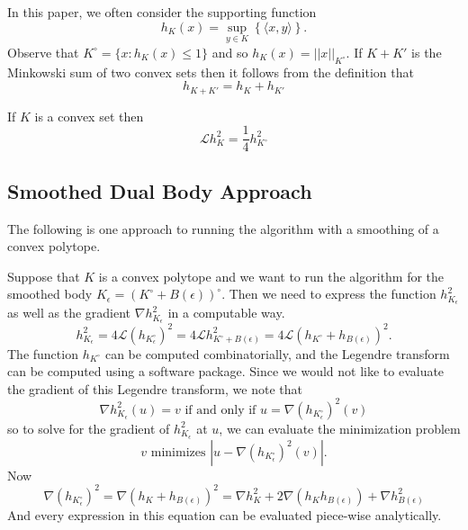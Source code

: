 \documentclass[../capacities_main.tex]{subfiles}
\begin{document}
	In this paper, we often consider the supporting function
	\begin{equation*}
	h_K(x) = \sup_{y\in K}\left\{ \langle x,y\rangle \right\}. 
	\end{equation*}
	Observe that $K^{\circ} = \{x :h_K(x)\leq 1\}$ and so $h_{K}(x) = ||x||_{K^{\circ}}$. If $K+K'$ is the Minkowski sum of 
	two convex sets then it follows from the definition that
	\begin{equation*}
	h_{K+K'} = h_K + h_{K'}
	\end{equation*}
	
	\begin{Proposition}
		If $K$ is a convex set then 
		\begin{equation*}
		\mathcal{L}h_K^2 = \frac{1}{4}h_{K^{\circ}}^2
		\end{equation*}
	\end{Proposition}
	
	\subsection{Smoothed Dual Body Approach}
	
	The following is one approach to running the algorithm with a smoothing of a convex polytope.
	
	Suppose that $K$ is a convex polytope and we want to run the algorithm for the smoothed body $K_{\epsilon} = \left(K^{\circ} + B(\epsilon)\right)^{\circ}$. Then we need to express the function $h^2_{K_{\epsilon}}$ as well as the gradient $\nabla h^2_{K_{\epsilon}}$ in a computable way. 
	\begin{equation*}
	h_{K_{\epsilon}}^2 = 4\mathcal{L} \left(h_{K_{\epsilon}^{\circ}}\right)^2=  4\mathcal{L}h_{K^{\circ} + B(\epsilon)}^2 = 4\mathcal{L}\left( h_{K^{\circ}}+h_{B(\epsilon)}\right)^2.
	\end{equation*}
	The function $h_{K^{\circ}}$ can be computed combinatorially, and the Legendre transform can be computed using a software package.  Since we would not like to evaluate the gradient of this Legendre transform, we note that
	\begin{equation*}
	\nabla h_{K_{\epsilon}}^2(u) = v \mbox{ if and only if } u = \nabla \left(h_{K_{\epsilon}^{\circ}}\right)^2(v)
	\end{equation*}
	so to solve for the gradient of $h_{K_{\epsilon}}^2$ at $u$, we can evaluate the minimization problem
	\begin{equation*}
	v\mbox{ minimizes } |u - \nabla \left(h_{K_{\epsilon}^{\circ}}\right)^2(v)|.
	\end{equation*}
	Now
	\begin{equation*}
	\nabla \left(h_{K_{\epsilon}^{\circ}}\right)^2 = \nabla \left(h_{K} + h_{B(\epsilon)}\right)^2 = \nabla h_{K}^2 + 2\nabla \left(h_{K}h_{B(\epsilon)}\right)  + \nabla h_{B(\epsilon)}^2
	\end{equation*}
	And every expression in this equation can be evaluated piece-wise analytically.
	
	
\end{document}
